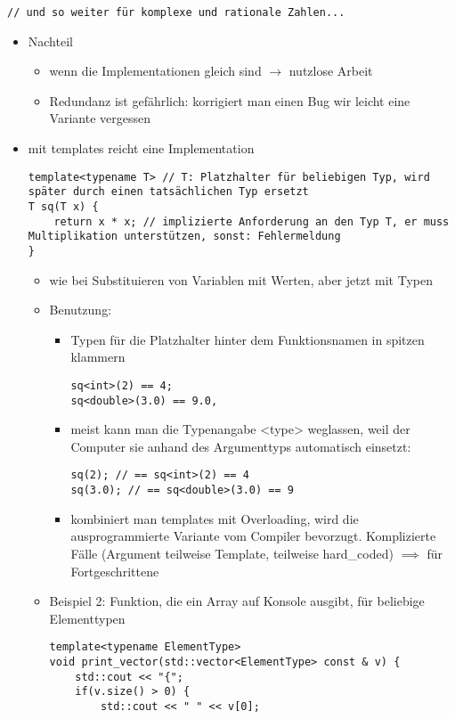\documentclass[a4paper]{scrartcl}
\theoremstyle{definition}
\theoremstyle{plain}
\theoremstyle{remark}
\theoremstyle{remark}
\begin{document}
\begin{itemize}
\begin{enumerate}
\begin{verbatim}
// und so weiter für komplexe und rationale Zahlen...
\end{verbatim}
\begin{itemize}
\item Nachteil
\begin{itemize}
\item wenn die Implementationen gleich sind $\rightarrow$ nutzlose Arbeit
\item Redundanz ist gefährlich: korrigiert man einen Bug wir leicht eine Variante vergessen
\end{itemize}
\item mit templates reicht eine Implementation
\begin{verbatim}
template<typename T> // T: Platzhalter für beliebigen Typ, wird später durch einen tatsächlichen Typ ersetzt
T sq(T x) {
	return x * x; // implizierte Anforderung an den Typ T, er muss Multiplikation unterstützen, sonst: Fehlermeldung
}
\end{verbatim}
\begin{itemize}
\item wie bei Substituieren von Variablen mit Werten, aber jetzt mit Typen
\item Benutzung:
\begin{itemize}
\item Typen für die Platzhalter hinter dem Funktionsnamen in spitzen klammern
\begin{verbatim}
sq<int>(2) == 4;
sq<double>(3.0) == 9.0,
\end{verbatim}
\item meist kann man die Typenangabe <type> weglassen, weil der Computer sie anhand des Argumenttyps automatisch einsetzt:
\begin{verbatim}
sq(2); // == sq<int>(2) == 4
sq(3.0); // == sq<double>(3.0) == 9
\end{verbatim}
\item kombiniert man templates mit Overloading, wird die ausprogrammierte Variante vom Compiler bevorzugt.
Komplizierte Fälle (Argument teilweise Template, teilweise hard\_coded) $\implies$ für Fortgeschrittene
\end{itemize}
\item Beispiel 2: Funktion, die ein Array auf Konsole ausgibt, für beliebige Elementtypen
\begin{verbatim}
template<typename ElementType>
void print_vector(std::vector<ElementType> const & v) {
	std::cout << "{";
	if(v.size() > 0) {
		std::cout << " " << v[0];

\end{verbatim}
\end{itemize}
\end{itemize}
\end{enumerate}
\end{itemize}
\end{document}
